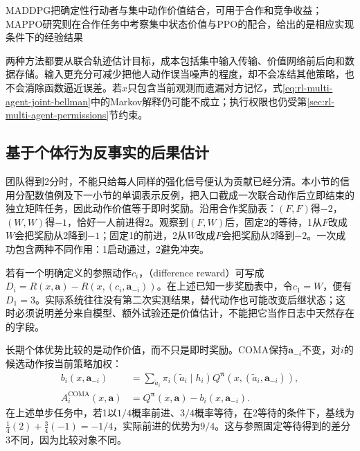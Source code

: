 MADDPG把确定性行动者与集中动作价值结合，可用于合作和竞争收益；MAPPO研究则在合作任务中考察集中状态价值与PPO的配合，给出的是相应实现条件下的经验结果

两种方法都要从联合轨迹估计目标，成本包括集中输入传输、价值网络前后向和数据存储。输入更充分可减少把他人动作误当噪声的程度，却不会冻结其他策略，也不会消除函数逼近误差。若$x$只包含当前观测而遗漏对方记忆，式\eqref{eq:rl-multi-agent-joint-bellman}中的Markov解释仍可能不成立；执行权限也仍受第\ref{sec:rl-multi-agent-permissions}节约束。

\subsection{基于个体行为反事实的后果估计}
\label{sec:rl-multi-agent-counterfactual}

团队得到2分时，不能只给每人同样的强化信号便认为贡献已经分清。本小节的信用分配数值例及下一小节的单调表示反例，把入口截成一次联合动作后立即结束的独立矩阵任务，因此动作价值等于即时奖励。沿用合作奖励表：$(F,F)$得$-2$，$(W,W)$得$-1$，恰好一人前进得2。观察到$(F,W)$后，固定2的等待，1从$F$改成$W$会把奖励从2降到$-1$；固定1的前进，2从$W$改成$F$会把奖励从2降到$-2$。一次成功包含两种不同作用：1启动通过，2避免冲突。

若有一个明确定义的参照动作$c_i$，（difference reward）可写成
$D_i=R(x,\bm a)-R(x,(c_i,\bm a_{-i}))$。在上述已知一步奖励表中，令$c_1=W$，便有$D_1=3$。实际系统往往没有第二次实测结果，替代动作也可能改变后继状态；这时必须说明差分来自模型、额外试验还是价值估计，不能把它当作日志中天然存在的字段。

长期个体优势比较的是动作价值，而不只是即时奖励。COMA保持$\bm a_{-i}$不变，对$i$的候选动作按当前策略加权：
\begin{align}
 b_i(x,\bm a_{-i})
 &=\sum_{\tilde a_i}\pi_i(\tilde a_i\mid h_i)
       Q^{\bm\pi}(x,(\tilde a_i,\bm a_{-i})),\\
 A_i^{\text{COMA}}(x,\bm a)
 &=Q^{\bm\pi}(x,\bm a)-b_i(x,\bm a_{-i}).
 \label{eq:rl-multi-agent-coma}
\end{align}
在上述单步任务中，若1以$1/4$概率前进、$3/4$概率等待，在2等待的条件下，基线为
$\tfrac14(2)+\tfrac34(-1)=-1/4$，实际前进的优势为$9/4$。这与参照固定等待得到的差分3不同，因为比较对象不同。

